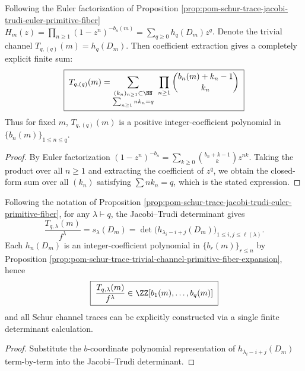 \begin{proposition}\label{prop:pom-schur-trace-trivial-channel-primitive-fiber-expansion}
Following the Euler factorization of Proposition \ref{prop:pom-schur-trace-jacobi-trudi-euler-primitive-fiber}
\(
H_m(z)=\prod_{n\ge 1}(1-z^n)^{-b_n(m)}=\sum_{q\ge 0}h_q(D_m)z^q
\).
Denote the trivial channel \(T_{q,(q)}(m)=h_q(D_m)\).
Then coefficient extraction gives a completely explicit finite sum:
\[
\boxed{\;
T_{q,(q)}(m)=
\sum_{\substack{(k_n)_{n\ge 1}\subset\NN\\ \sum_{n\ge 1}n k_n=q}}
\ \prod_{n\ge 1}\binom{b_n(m)+k_n-1}{k_n}\;}
\]
Thus for fixed \(m\), \(T_{q,(q)}(m)\) is a positive integer-coefficient polynomial in \(\{b_n(m)\}_{1\le n\le q}\).
\end{proposition}
\begin{proof}
By Euler factorization
\(
(1-z^n)^{-b_n}=\sum_{k\ge 0}\binom{b_n+k-1}{k}z^{nk}
\).
Taking the product over all \(n\ge 1\) and extracting the coefficient of \(z^q\), we obtain the closed-form sum over all \((k_n)\) satisfying \(\sum n k_n=q\), which is the stated expression.
\end{proof}
\begin{corollary}\label{cor:pom-schur-trace-all-channels-primitive-fiber-coordinate}
Following the notation of Proposition \ref{prop:pom-schur-trace-jacobi-trudi-euler-primitive-fiber},
for any \(\lambda\vdash q\), the Jacobi--Trudi determinant gives
\[
\frac{T_{q,\lambda}(m)}{f^\lambda}
=s_\lambda(D_m)
=\det\bigl(h_{\lambda_i-i+j}(D_m)\bigr)_{1\le i,j\le \ell(\lambda)}.
\]
Each \(h_n(D_m)\) is an integer-coefficient polynomial in \(\{b_r(m)\}_{r\le n}\) by Proposition \ref{prop:pom-schur-trace-trivial-channel-primitive-fiber-expansion},
hence
\[
\boxed{\;
\frac{T_{q,\lambda}(m)}{f^\lambda}\in \ZZ[b_1(m),\dots,b_q(m)]\;}
\]
and all Schur channel traces can be explicitly constructed via a single finite determinant calculation.
\end{corollary}
\begin{proof}
Substitute the \(b\)-coordinate polynomial representation of \(h_{\lambda_i-i+j}(D_m)\) term-by-term into the Jacobi--Trudi determinant.
\end{proof}
